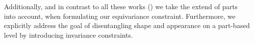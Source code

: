 	Additionally, and in contrast to all these works (\cite{Thewlis:2017wi, Zhang:2018vz, Jakab:2018wc}) we take the extend of parts into account, when formulating our equivariance constraint. Furthermore, we explicitly address the goal of disentangling shape and appearance on a part-based level by introducing invariance constraints.
